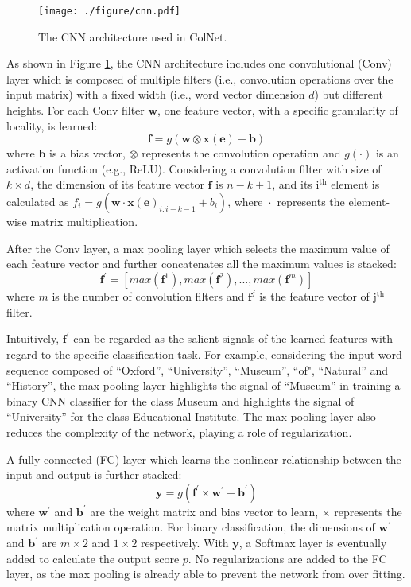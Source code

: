 \documentclass[letterpaper]{article}
\newcommand{\rv}[1]{{\color{black}#1}}
\newcommand{\camera}[1]{{\color{black}#1}}
\newcommand{\ColNet}{\textsf{ColNet}\xspace}
\begin{document}
\begin{figure}[h]
\centering
\texttt{[image: ./figure/cnn.pdf]}
\caption{The CNN architecture used in \ColNet.
}
\label{fig:cnn}
\end{figure}

As shown in Figure \ref{fig:cnn},
the CNN architecture includes one convolutional (Conv) layer 
which is composed of multiple filters (i.e., convolution operations over the input matrix) with a fixed width (i.e., word vector dimension $d$) but different heights. 
For each Conv filter $\bm{w}$,
one feature vector, 
with a specific granularity of locality, 
is learned:
\begin{equation}
\bm{f} = g(\bm{w} \otimes \bm{x}(\bm{e})  + \bm{b})
\end{equation}
where 
$\bm{b}$ is a bias vector,
$\otimes$ represents the convolution operation
and $g(\cdot)$ is an activation function \rv{(e.g., ReLU)}.
\camera{Considering} a convolution filter with size of $k \times d $,
the dimension of its feature vector $\bm{f}$ is $n - k + 1$,
and its $\text{i}^{\text{th}}$ element is calculated as $f_i = g(\bm{w} \cdot \bm{x}(\bm{e})_{i:i+k-1} + b_i)$,
where~$\cdot$~represents the element-wise matrix multiplication.

After the Conv layer, 
\rv{a max pooling layer which selects the maximum value of each feature vector and further concatenates all the maximum values
is stacked:}
\begin{equation}
\bm{f}^{\prime} = 
\left[ max(\bm{f}^1),max(\bm{f}^2),...,max(\bm{f}^m) \right]
\end{equation}
where $m$ is the number of convolution filters and 
$\bm{f}^j$ is the feature vector of $\text{j}^{\text{th}}$ filter. 


Intuitively, $\bm{f}^{\prime}$ can be regarded as the salient signals of the learned features with regard to the specific classification task.
For example, considering the input word sequence composed of ``Oxford'', ``University'', ``Museum'', ``of", ``Natural'' and ``History'', 
the max pooling layer highlights the signal of ``Museum'' in training a binary CNN classifier for the class Museum
and highlights the signal of ``University'' for the class Educational Institute.
The max pooling layer also reduces the complexity of the network, 
playing a role of regularization.

A fully connected (FC) layer which learns the nonlinear relationship between the input and output is further stacked:
\begin{equation}
\bm{y} = g(\bm{f}^{\prime} \times \bm{w}^{\prime} + \bm{b}^{\prime})
\end{equation}
where $\bm{w}^{\prime}$ and $\bm{b}^{\prime}$ are the weight matrix and bias vector to learn,
$\times$ represents the matrix multiplication operation.
For binary classification, 
the dimensions of $\bm{w}^{\prime}$ and $\bm{b}^{\prime}$ are $m \times 2$ and $1 \times 2$ respectively.
\rv{With $\bm{y}$, a Softmax layer is eventually added to calculate the output score $p$.}
No regularizations are added to the FC layer,
as the max pooling is already able to prevent the network from over fitting.
\end{document}
